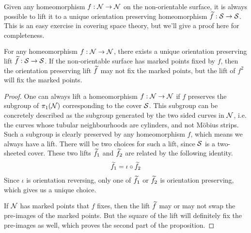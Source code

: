 Given any homeomorphism $f: \mathcal{N} \to \mathcal{N}$ on the non-orientable surface, it is always possible to lift it
to a unique orientation preserving homeomorphism $\widetilde{f}: \mathcal{S} \to \mathcal{S}$. This is an easy exercise in covering
space theory, but we'll give a proof here for completeness.
\begin{prop}
  For any homeomorphism $f: \mathcal{N} \to \mathcal{N}$, there exists a unique orientation preserving lift
  $\widetilde{f}: \mathcal{S} \to \mathcal{S}$. If the non-orientable surface has marked points fixed by $f$, then
  the orientation preserving lift $\widetilde{f}$ may not fix the marked points, but the lift of $f^2$ will
  fix the marked points.
\end{prop}
\begin{proof}
  One can always lift a homeomorphism $f: \mathcal{N} \to \mathcal{N}$ if $f$ preserves the subgroup of $\pi_1(\mathcal{N})$ corresponding
  to the cover $\mathcal{S}$. This subgroup can be concretely described as the subgroup generated by the two sided curves
  in $\mathcal{N}$, i.e. the curves whose tubular neighbourhoods are cylinders, and not M\"obius strips. Such a subgroup
  is clearly preserved by any homeomorphism $f$, which means we always have a lift. There will be two choices
  for such a lift, since $\mathcal{S}$ is a two-sheeted cover. These two lifts $\widetilde{f}_1$ and $\widetilde{f}_2$ are related
  by the following identity.
  \begin{align*}
    \widetilde{f}_1 = \iota \circ \widetilde{f}_2
  \end{align*}
  Since $\iota$ is orientation reversing, only one of $\widetilde{f}_1$ or $\widetilde{f}_2$ is orientation preserving, which
  gives us a unique choice.

  If $\mathcal{N}$ has marked points that $f$ fixes, then the lift $\widetilde{f}$ may or may not swap the pre-images of the
  marked points. But the square of the lift will definitely fix the pre-images as well, which proves the second
  part of the proposition.
\end{proof}

